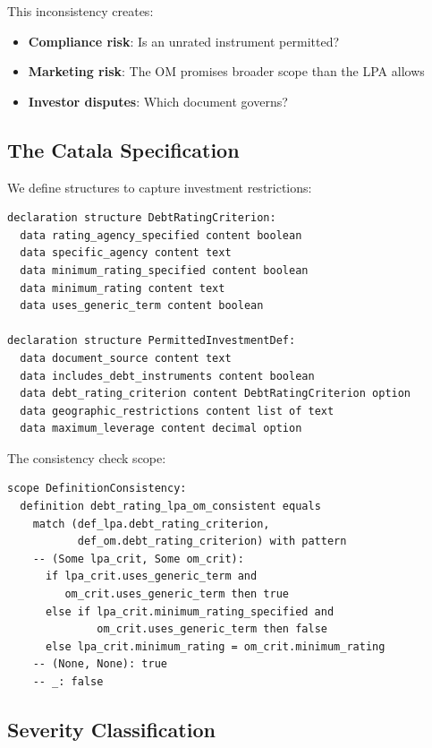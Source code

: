 This inconsistency creates:
\begin{itemize}
  \item \textbf{Compliance risk}: Is an unrated instrument permitted?
  \item \textbf{Marketing risk}: The OM promises broader scope than the LPA allows
  \item \textbf{Investor disputes}: Which document governs?
\end{itemize}

\subsection{The Catala Specification}
\label{sec:crossref-spec}

We define structures to capture investment restrictions:

\begin{lstlisting}
declaration structure DebtRatingCriterion:
  data rating_agency_specified content boolean
  data specific_agency content text
  data minimum_rating_specified content boolean
  data minimum_rating content text
  data uses_generic_term content boolean

declaration structure PermittedInvestmentDef:
  data document_source content text
  data includes_debt_instruments content boolean
  data debt_rating_criterion content DebtRatingCriterion option
  data geographic_restrictions content list of text
  data maximum_leverage content decimal option
\end{lstlisting}

The consistency check scope:

\begin{lstlisting}
scope DefinitionConsistency:
  definition debt_rating_lpa_om_consistent equals
    match (def_lpa.debt_rating_criterion, 
           def_om.debt_rating_criterion) with pattern
    -- (Some lpa_crit, Some om_crit):
      if lpa_crit.uses_generic_term and 
         om_crit.uses_generic_term then true
      else if lpa_crit.minimum_rating_specified and 
              om_crit.uses_generic_term then false
      else lpa_crit.minimum_rating = om_crit.minimum_rating
    -- (None, None): true
    -- _: false
\end{lstlisting}

\subsection{Severity Classification}
\label{sec:crossref-severity}

